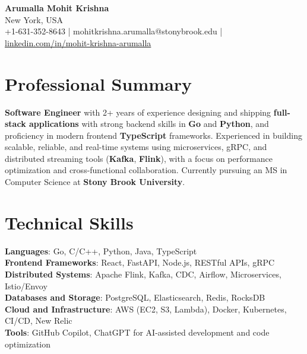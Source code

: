 \documentclass[letterpaper,11pt]{article}
\begin{document}
\begin{center}
  {\Large \textbf{Arumalla Mohit Krishna}} \\
  New York, USA \\
  +1-631-352-8643 \enspace | \enspace mohitkrishna.arumalla@stonybrook.edu \enspace | \enspace \href{https://www.linkedin.com/in/mohit-krishna-arumalla}{linkedin.com/in/mohit-krishna-arumalla}
\end{center}

\section{Professional Summary}
  \begin{itemize}[leftmargin=0.15in, label={}]
    \small{\item{
     \textbf{Software Engineer} with 2+ years of experience designing and shipping \textbf{full-stack applications} with strong backend skills in \textbf{Go} and \textbf{Python}, and proficiency in modern frontend \textbf{TypeScript} frameworks. Experienced in building scalable, reliable, and real-time systems using microservices, gRPC, and distributed streaming tools (\textbf{Kafka}, \textbf{Flink}), with a focus on performance optimization and cross-functional collaboration. Currently pursuing an MS in Computer Science at \textbf{Stony Brook University}.
    }}
  \end{itemize}
\vspace{-16pt}

\section{Technical Skills}
 \begin{itemize}[leftmargin=0.15in, label={}]
    \small{\item{
     \textbf{Languages}: Go, C/C++, Python, Java, TypeScript \\
     \textbf{Frontend Frameworks}: React, FastAPI, Node.js, RESTful APIs, gRPC \\
     \textbf{Distributed Systems}: Apache Flink, Kafka, CDC, Airflow, Microservices, Istio/Envoy \\
     \textbf{Databases and Storage}: PostgreSQL, Elasticsearch, Redis, RocksDB \\
     \textbf{Cloud and Infrastructure}: AWS (EC2, S3, Lambda), Docker, Kubernetes, CI/CD, New Relic \\
     \textbf{Tools}: GitHub Copilot, ChatGPT for AI-assisted development and code optimization
    }}
 \end{itemize}
\vspace{-16pt}
\end{document}
